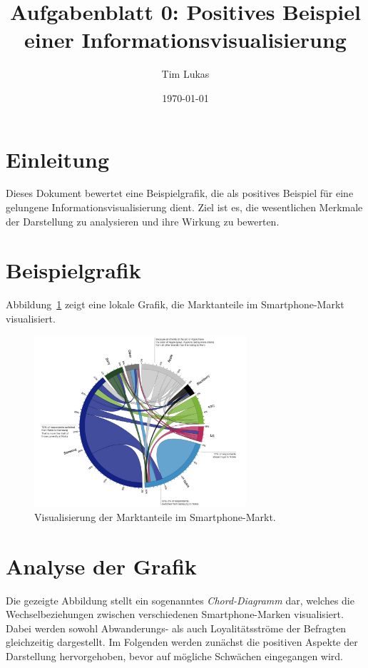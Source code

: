 \documentclass[a4paper,12pt]{article}
\title{Aufgabenblatt 0: Positives Beispiel einer Informationsvisualisierung}
\author{Tim Lukas}
\date{\today}
\begin{document}
\maketitle

\section{Einleitung}
Dieses Dokument bewertet eine Beispielgrafik, die als positives Beispiel für eine gelungene Informationsvisualisierung dient.  
Ziel ist es, die wesentlichen Merkmale der Darstellung zu analysieren und ihre Wirkung zu bewerten.

\section{Beispielgrafik}
Abbildung~\ref{fig:beispiel} zeigt eine lokale Grafik, die Marktanteile im Smartphone-Markt visualisiert.

\begin{figure}[h!]
    \centering
    \includegraphics[width=0.7\textwidth]{Visualisierungsbeispiel_tim_lukas.JPG}
    \caption{Visualisierung der Marktanteile im Smartphone-Markt.}
    \label{fig:beispiel}
\end{figure}

\section{Analyse der Grafik}
Die gezeigte Abbildung stellt ein sogenanntes \textit{Chord-Diagramm} dar, welches die Wechselbeziehungen zwischen verschiedenen Smartphone-Marken visualisiert. 
Dabei werden sowohl Abwanderungs- als auch Loyalitätsströme der Befragten gleichzeitig dargestellt. 
Im Folgenden werden zunächst die positiven Aspekte der Darstellung hervorgehoben, bevor auf mögliche Schwächen eingegangen wird.
\end{document}
